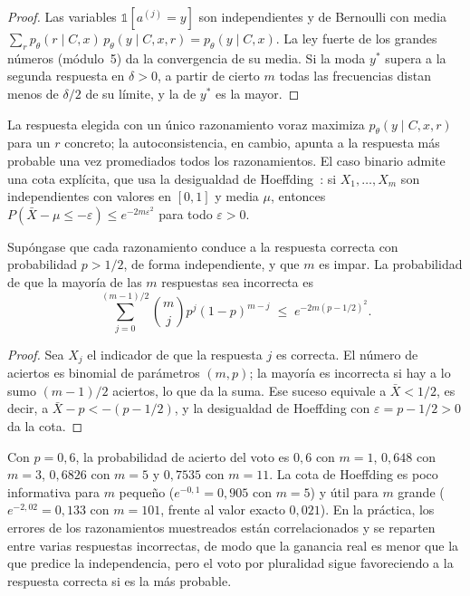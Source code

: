 \begin{proof}
Las variables $\mathbb{1}[a^{(j)}=y]$ son independientes y de Bernoulli con media $\sum_r p_\theta(r\mid C,x)\,p_\theta(y\mid C,x,r)=p_\theta(y\mid C,x)$. La ley fuerte de los grandes números (módulo~5) da la convergencia de su media. Si la moda $y^\ast$ supera a la segunda respuesta en $\delta>0$, a partir de cierto $m$ todas las frecuencias distan menos de $\delta/2$ de su límite, y la de $y^\ast$ es la mayor.
\end{proof}

La respuesta elegida con un único razonamiento voraz maximiza $p_\theta(y\mid C,x,r)$ para un $r$ concreto; la autoconsistencia, en cambio, apunta a la respuesta más probable una vez promediados todos los razonamientos. El caso binario admite una cota explícita, que usa la desigualdad de Hoeffding~\cite{hoeffding}: si $X_1,\dots,X_m$ son independientes con valores en $[0,1]$ y media $\mu$, entonces $P(\bar X-\mu\le -\varepsilon)\le e^{-2m\varepsilon^{2}}$ para todo $\varepsilon>0$.

\begin{proposicion}\label{prop:voto}
Supóngase que cada razonamiento conduce a la respuesta correcta con probabilidad $p>1/2$, de forma independiente, y que $m$ es impar. La probabilidad de que la mayoría de las $m$ respuestas sea incorrecta es
\[
\sum_{j=0}^{(m-1)/2}\binom{m}{j}p^{j}(1-p)^{m-j}\;\le\;e^{-2m(p-1/2)^{2}}.
\]
\end{proposicion}

\begin{proof}
Sea $X_j$ el indicador de que la respuesta $j$ es correcta. El número de aciertos es binomial de parámetros $(m,p)$; la mayoría es incorrecta si hay a lo sumo $(m-1)/2$ aciertos, lo que da la suma. Ese suceso equivale a $\bar X<1/2$, es decir, a $\bar X-p<-(p-1/2)$, y la desigualdad de Hoeffding con $\varepsilon=p-1/2>0$ da la cota.
\end{proof}

\begin{ejemplo}\label{ej:voto}
Con $p=0{,}6$, la probabilidad de acierto del voto es $0{,}6$ con $m=1$, $0{,}648$ con $m=3$, $0{,}6826$ con $m=5$ y $0{,}7535$ con $m=11$. La cota de Hoeffding es poco informativa para $m$ pequeño ($e^{-0{,}1}=0{,}905$ con $m=5$) y útil para $m$ grande ($e^{-2{,}02}=0{,}133$ con $m=101$, frente al valor exacto $0{,}021$). En la práctica, los errores de los razonamientos muestreados están correlacionados y se reparten entre varias respuestas incorrectas, de modo que la ganancia real es menor que la que predice la independencia, pero el voto por pluralidad sigue favoreciendo a la respuesta correcta si es la más probable.
\end{ejemplo}

